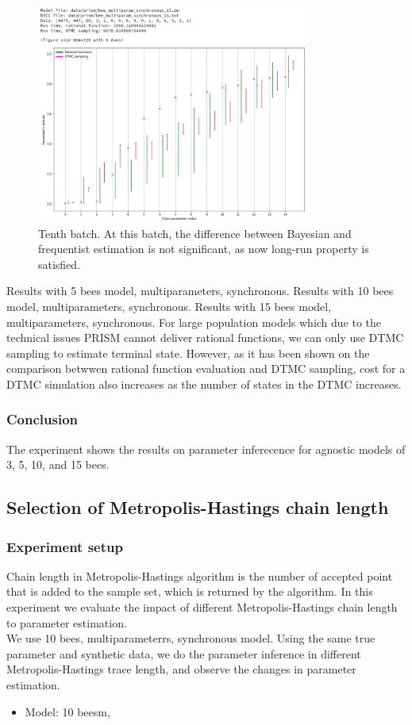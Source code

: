 \documentclass[12pt]{article}
\theoremstyle{definition}
\begin{document}
\begin{figure}[H]
  \centering
  \includegraphics[width=0.8\textwidth,keepaspectratio]{figures/normal_15.png}
  \caption{Tenth batch. At this batch, the difference between Bayesian and
    frequentist estimation is not significant, as now long-run property is satisfied.}
\end{figure}
Results with 5 bees model, multiparameters, synchronous.
Results with 10 bees model, multiparameters, synchronous.
Results with 15 bees model, multiparameters, synchronous.
For large population models which due to the technical issues PRISM cannot
deliver rational functions, we can only use DTMC sampling to estimate terminal
state. However, as it has been shown on the comparison betwwen rational function
evaluation and DTMC sampling, cost for a DTMC simulation also increases as the
number of states in the DTMC increases.\\

\subsubsection{Conclusion}
The experiment shows the results on parameter inferecence for agnostic models of
3, 5, 10, and 15 bees.


\subsection{Selection of Metropolis-Hastings chain length}
\subsubsection{Experiment setup}
Chain length in Metropolis-Hastings algorithm is the number of accepted point
that is added to the sample set, which is returned by the algorithm. In this
experiment we evaluate the impact of different Metropolis-Hastings chain length
to parameter estimation.\\
We use 10 bees, multiparameterrs, synchronous model. Using the same true
parameter and synthetic data, we do the parameter inference in different
Metropolis-Hastings trace length, and observe the changes in parameter
estimation.
\begin{itemize}
\item Model: 10 beesm, 
\end{itemize}
\end{document}
